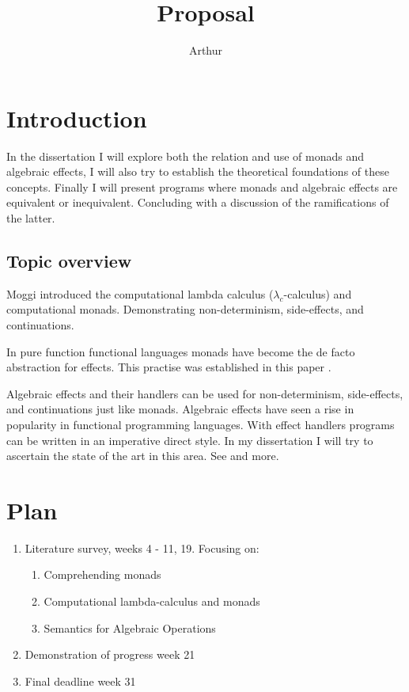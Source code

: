 \documentclass[a4paper,10pt]{article}
\title{Proposal}
\author{Arthur}
\begin{document}
\section{Introduction}

In the dissertation I will explore both the relation and use of monads and algebraic effects,
I will also try to establish the theoretical foundations of these concepts.
Finally I will present programs where monads and algebraic effects are equivalent or
inequivalent. Concluding with a discussion of the ramifications of the latter.

\subsection{Topic overview}
Moggi \cite{Moggi:hc} introduced the computational lambda calculus (${\lambda}_c$-calculus)
and computational monads. Demonstrating non-determinism, side-effects, and continuations.

In pure function functional languages monads have become the de facto abstraction for effects.
This practise was established in this paper \cite{wadler1990}.

Algebraic effects \cite{plotkin2001adequacy} and their handlers \cite{Plotkin:2001jr}
can be used for non-determinism, side-effects, and continuations just like monads.
Algebraic effects have seen a rise in popularity in functional programming languages.
With effect handlers programs can be written in an imperative direct style.
In my dissertation I will try to ascertain the state of the art in this area.
See \cite{Bauer:2013fn, leijen:16, Lindley:2016vz, Dolan:2017} and more.



\section{Plan}

\begin{enumerate}
  \item Literature survey, weeks 4 - 11, 19. Focusing on:
    \begin{enumerate}
      \item Comprehending monads                     \cite{wadler1990}
      \item Computational lambda-calculus and monads \cite{Moggi:hc}
      \item Semantics for Algebraic Operations       \cite{Plotkin:2001jr}
    \end{enumerate}
  \item Demonstration of progress week 21
  \item Final deadline week 31
\end{enumerate}
\end{document}
